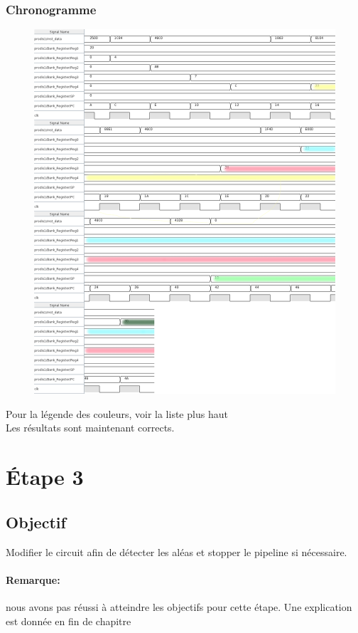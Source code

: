 \documentclass[a4paper]{article} %
\begin{document}
\subsubsection{Chronogramme}
\begin{figure}[H]
    \centering
    \includegraphics[width=.8\textwidth]{src/CHRONO_ET2_V3.png}
    \label{fig:chrono_et2_corr_pic}
\end{figure}
Pour la légende des couleurs, voir la liste plus haut \\
Les résultats sont maintenant corrects.
\section{Étape 3}
\subsection{Objectif}
Modifier le circuit afin de détecter les aléas et stopper le pipeline si nécessaire.
\paragraph{Remarque:}nous avons pas réussi à atteindre les objectifs pour cette étape. Une explication est donnée en fin de chapitre
\end{document}
